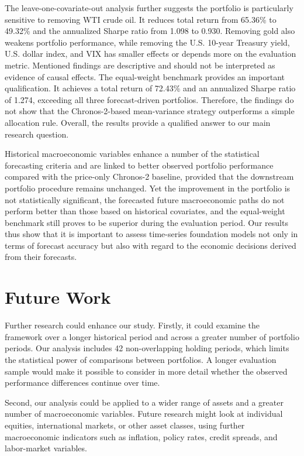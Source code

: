 \documentclass[12pt,a4paper,twoside,openany]{book}
\begin{document}
The leave-one-covariate-out analysis further suggests the portfolio is particularly sensitive to removing WTI crude oil. It reduces total return from 65.36\% to 49.32\% and the annualized Sharpe ratio from 1.098 to 0.930. Removing gold also weakens portfolio performance, while removing the U.S. 10-year Treasury yield, U.S. dollar index, and VIX has smaller effects or depends more on the evaluation metric. Mentioned findings are descriptive and should not be interpreted as evidence of causal effects. The equal-weight benchmark provides an important qualification. It achieves a total return of 72.43\% and an annualized Sharpe ratio of 1.274, exceeding all three forecast-driven portfolios. Therefore, the findings do not show that the Chronos-2-based mean-variance strategy outperforms a simple allocation rule. Overall, the results provide a qualified answer to our main research question.

Historical macroeconomic variables enhance a number of the statistical forecasting criteria and are linked to better observed portfolio performance compared with the price-only Chronos-2 baseline, provided that the downstream portfolio procedure remains unchanged. Yet the improvement in the portfolio is not statistically significant, the forecasted future macroeconomic paths do not perform better than those based on historical covariates, and the equal-weight benchmark still proves to be superior during the evaluation period. Our results thus show that it is important to assess time-series foundation models not only in terms of forecast accuracy but also with regard to the economic decisions derived from their forecasts.

\section{Future Work}\label{future-work}

Further research could enhance our study. Firstly, it could examine the framework over a longer historical period and across a greater number of portfolio periods. Our analysis includes 42 non-overlapping holding periods, which limits the statistical power of comparisons between portfolios. A longer evaluation sample would make it possible to consider in more detail whether the observed performance differences continue over time.

Second, our analysis could be applied to a wider range of assets and a greater number of macroeconomic variables. Future research might look at individual equities, international markets, or other asset classes, using further macroeconomic indicators such as inflation, policy rates, credit spreads, and labor-market variables.
\end{document}
